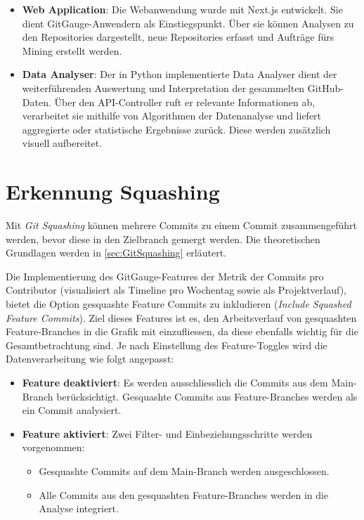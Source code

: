 \begin{itemize}
    \item \textbf{Web Application}: Die Webanwendung wurde mit Next.js entwickelt. Sie dient GitGauge-Anwendern als Einstiegspunkt. Über sie können Analysen zu den Repositories dargestellt, neue Repositories erfasst und Aufträge fürs Mining erstellt werden. 
    \item \textbf{Data Analyser}:  Der in Python implementierte Data Analyser dient der weiterführenden Auswertung und Interpretation der gesammelten GitHub-Daten. Über den API-Controller ruft er relevante Informationen ab, verarbeitet sie mithilfe von Algorithmen der Datenanalyse und liefert aggregierte oder statistische Ergebnisse zurück. Diese werden zusätzlich visuell aufbereitet.
\end{itemize}



\section{Erkennung Squashing}
Mit \textit{Git Squashing} können mehrere Commits zu einem Commit zusammengeführt werden, bevor diese in den Zielbranch gemergt werden. Die theoretischen Grundlagen werden in \autoref{sec:GitSquashing} erläutert. 

Die Implementierung des GitGauge-Features der Metrik der Commits pro Contributor (visualisiert als Timeline pro Wochentag sowie als Projektverlauf), bietet die Option gesquashte Feature Commits zu inkludieren (\textit{Include Squashed Feature Commits}). Ziel dieses Features ist es, den Arbeitsverlauf von gesquashten Feature-Branches in die Grafik mit einzufliessen, da diese ebenfalls wichtig für die Gesamtbetrachtung sind. 
Je nach Einstellung des Feature-Toggles wird die Datenverarbeitung wie folgt angepasst: \\
\begin{itemize}
    \item \textbf{Feature deaktiviert}: Es werden ausschliesslich die Commits aus dem Main-Branch berücksichtigt. Gesquashte Commits aus Feature-Branches werden als ein Commit analysiert.
    \item \textbf{Feature aktiviert}: Zwei Filter- und Einbeziehungsschritte werden vorgenommen:
        \begin{itemize}
        \item Gesquashte Commits auf dem Main-Branch werden ausgeschlossen.
        \item Alle Commits aus den gesquashten Feature-Branches werden in die Analyse integriert.
    \end{itemize}
\end{itemize}

